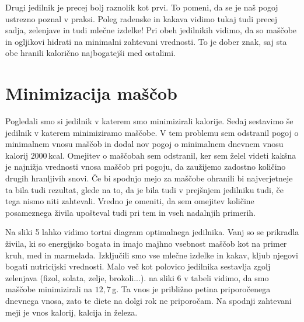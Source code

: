 \documentclass[slovene,11pt,a4paper]{article}
\begin{document}
Drugi jedilnik je precej bolj raznolik kot prvi. To pomeni, da se je naš pogoj ustrezno poznal v praksi. Poleg radenske in kakava vidimo tukaj tudi precej sadja, zelenjave in tudi mlečne izdelke! Pri obeh jedilnikih vidimo, da so maščobe in ogljikovi hidrati na minimalni zahtevani vrednosti. To je dober znak, saj sta obe hranili kalorično najbogatejši med ostalimi.

\section{Minimizacija maščob}

Pogledali smo si jedilnik v katerem smo minimizirali kalorije. Sedaj sestavimo še jedilnik v katerem minimiziramo maščobe. V tem problemu sem odstranil pogoj o minimalnem vnosu maščob in dodal nov pogoj o minimalnem dnevnem vnosu kalorij $2000\,$kcal. Omejitev o maščobah sem odstranil, ker sem želel videti kakšna je najnižja vrednosti vnosa maščob pri pogoju, da zaužijemo zadostno količino drugih hranljivih snovi. Če bi spodnjo mejo za maščobe ohranili bi najverjetneje ta bila tudi rezultat, glede na to, da je bila tudi v prejšnjem jedilniku tudi, če tega nismo niti zahtevali. Vredno je omeniti, da sem omejitev količine posameznega živila upošteval tudi pri tem in vseh nadalnjih primerih.

Na sliki 5 lahko vidimo tortni diagram optimalnega jedilnika. Vanj so se prikradla živila, ki so energijsko bogata in imajo majhno vsebnost maščob kot na primer kruh, med in marmelada. Izključili smo vse mlečne izdelke in kakav, kljub njegovi bogati nutricijski vrednosti. Malo več kot polovico jedilnika sestavlja zgolj zelenjava (fizol, solata, zelje, brokoli...). na sliki 6 v tabeli vidimo, da smo maščobe minimizirali na $12,7\,$g. Ta vnos je približno petina priporočenega dnevnega vnosa, zato te diete na dolgi rok ne priporočam. Na spodnji zahtevani meji je vnos kalorij, kalcija in železa.

\newpage
\end{document}
